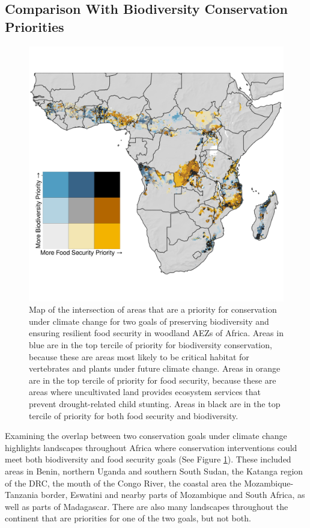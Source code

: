 \documentclass[titlepage]{article}
\begin{document}
\subsection{Comparison With Biodiversity Conservation Priorities}

\begin{figure}[h!]
	\begin{center}
		\includegraphics[width=0.8\linewidth]{Bivariate_Map.png}
		\caption{Map of the intersection of areas that are a priority for conservation under climate change for two goals of preserving biodiversity and ensuring resilient food security in woodland AEZs of Africa.  Areas in blue are in the top tercile of priority for biodiversity conservation, because these are areas most likely to be critical habitat for vertebrates and plants under future climate change.  Areas in orange are in the top tercile of priority for food security, because these are areas where uncultivated land provides ecosystem services that prevent drought-related child stunting.  Areas in black are in the top tercile of priority for both food security and biodiversity.}
		\label{fig:Bivariate_Map}
	\end{center}
\end{figure}

Examining the overlap between two conservation goals under climate change highlights landscapes throughout Africa where conservation interventions could meet both biodiversity and food security goals (See Figure \ref{fig:Bivariate_Map}).  These included areas in Benin, northern Uganda and southern South Sudan, the Katanga region of the DRC, the mouth of the Congo River, the coastal area the Mozambique-Tanzania border, Eswatini and nearby parts of Mozambique and South Africa, as well as parts of Madagascar. There are also many landscapes throughout the continent that are priorities for one of the two goals, but not both.
\end{document}
